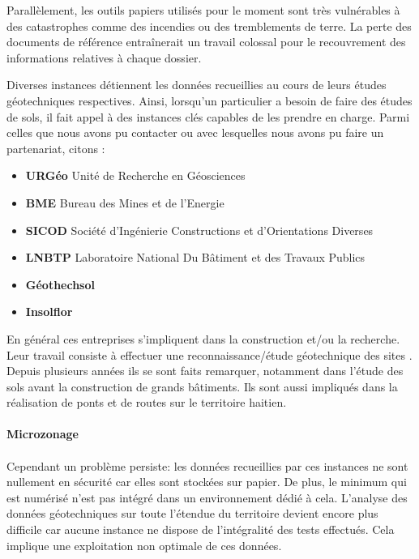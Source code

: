 \par
Parallèlement, les outils papiers utilisés pour le moment sont très vulnérables à des
catastrophes comme des incendies ou des tremblements de terre. La perte 
des documents de référence entraînerait un travail
colossal pour le recouvrement des informations relatives à chaque 
dossier.
\par
Diverses instances détiennent les données recueillies au cours
de leurs études géotechniques respectives. 
Ainsi, lorsqu’un particulier a besoin de faire des études de sols, il 
fait appel à des instances clés capables de les prendre en charge. 
Parmi celles que nous avons pu contacter ou avec lesquelles nous avons pu faire un partenariat, 
citons :
\begin{itemize}
    \item \textbf{URGéo}
    Unité de Recherche en Géosciences \cite{linkurgeo} 
    \item \textbf{BME}
    Bureau des Mines et de l’Energie \cite{linkbme} 
    \item \textbf{SICOD}
    Société d’Ingénierie Constructions et d’Orientations Diverses
    \item \textbf{LNBTP}
    Laboratoire National Du Bâtiment et des Travaux Publics \cite{linklnbtp} 
    \item \textbf{Géothechsol} \cite{linkgeotechsol} 
    \item \textbf{Insolflor} 
\end{itemize}   

\par
En général ces entreprises s'impliquent dans la construction et/ou la recherche. 
Leur travail consiste à effectuer une reconnaissance/étude géotechnique des sites .
Depuis plusieurs années ils se sont faits remarquer, notamment dans
l'étude des sols avant la construction de grands bâtiments. Ils sont aussi impliqués
dans la réalisation de ponts et de routes sur le territoire
haitien.
\paragraph{Microzonage}
\paragraph{}


\paragraph{}
Cependant un problème persiste: les données recueillies par ces instances
ne sont nullement en sécurité car elles sont stockées sur papier.
De plus, le minimum qui est numérisé n'est pas intégré dans un environnement 
dédié à cela.
L'analyse des données géotechniques sur toute l'étendue du territoire devient
encore plus difficile car aucune instance ne dispose de l'intégralité des tests effectués.
Cela implique une exploitation non optimale de ces données.

